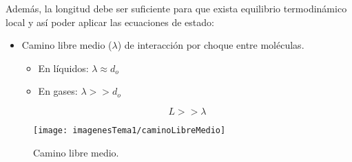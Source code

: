 Además, la longitud debe ser suficiente para que exista equilibrio termodinámico local y así poder aplicar las ecuaciones de estado:

\begin{itemize}
	\item Camino libre medio ($\lambda$) de interacción por choque entre moléculas.
	\begin{itemize}
		\item En líquidos: $\lambda \approx d_o$
		\item En gases: $\lambda >> d_o$
	\end{itemize}
	\[L >> \lambda\]
\end{itemize}

\begin{figure}[H]
	\centering
	\texttt{[image: imagenesTema1/caminoLibreMedio]}
	\caption{Camino libre medio.}
	\label{fig:caminolibremedio}
\end{figure}

